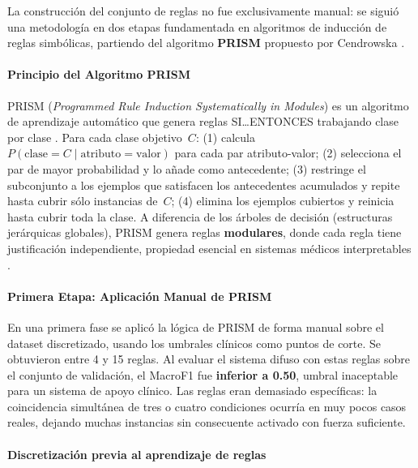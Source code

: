 \documentclass[11pt]{article}
\begin{document}
La construcci\'on del conjunto de reglas no fue exclusivamente manual: se siguió una metodolog\'ia en dos etapas fundamentada en algoritmos de inducci\'on de reglas simb\'olicas, partiendo del algoritmo \textbf{PRISM} propuesto por Cendrowska \cite{cendrowska1987}.

\paragraph{Principio del Algoritmo PRISM}

PRISM (\textit{Programmed Rule Induction Systematically in Modules}) es un algoritmo de aprendizaje autom\'atico que genera reglas SI\ldots ENTONCES trabajando clase por clase \cite{cendrowska1987}. Para cada clase objetivo~$C$: (1) calcula $P(\text{clase}=C \mid \text{atributo}=\text{valor})$ para cada par atributo-valor; (2) selecciona el par de mayor probabilidad y lo a\~nade como antecedente; (3) restringe el subconjunto a los ejemplos que satisfacen los antecedentes acumulados y repite hasta cubrir s\'olo instancias de~$C$; (4) elimina los ejemplos cubiertos y reinicia hasta cubrir toda la clase. A diferencia de los \'arboles de decisi\'on (estructuras jer\'arquicas globales), PRISM genera reglas \textbf{modulares}, donde cada regla tiene justificaci\'on independiente, propiedad esencial en sistemas m\'edicos interpretables \cite{cendrowska1987}.

\paragraph{Primera Etapa: Aplicaci\'on Manual de PRISM}

En una primera fase se aplic\'o la l\'ogica de PRISM de forma manual sobre el dataset discretizado, usando los umbrales cl\'inicos como puntos de corte. Se obtuvieron entre 4 y 15 reglas. Al evaluar el sistema difuso con estas reglas sobre el conjunto de validaci\'on, el MacroF1 fue \textbf{inferior a 0.50}, umbral inaceptable para un sistema de apoyo cl\'inico. Las reglas eran demasiado espec\'ificas: la coincidencia simult\'anea de tres o cuatro condiciones ocurr\'ia en muy pocos casos reales, dejando muchas instancias sin consecuente activado con fuerza suficiente.

\paragraph{Discretizaci\'on previa al aprendizaje de reglas}
\end{document}

